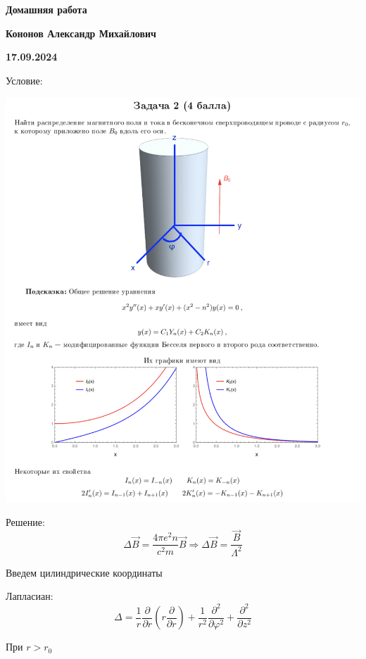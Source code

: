 \documentclass[12pt]{article}
\begin{document}
\begin{large}
\begin{center}
\LARGE \textbf{Домашняя работа}
\par
\LARGE \textbf{Кононов Александр Михайлович}
\par
    \textbf{17.09.2024}
\end{center}
\par Условие:
\par
\includegraphics[width=\textwidth]{photo.png}
\par Решение:
\[
    \Delta \overrightarrow{B} = \frac{4\pi e^2 n}{c^2 m} \overrightarrow{B} \Rightarrow \Delta \overrightarrow{B} = \frac{\overrightarrow{B}}{\Lambda^2}
\]
\par Введем цилиндрические координаты
\par Лапласиан:
\[
    \Delta = \frac{1}{r} \frac{\partial}{\partial r} \left( r \frac{\partial}{\partial r} \right) + \frac{1}{r^2} \frac{\partial^2}{\partial \varphi^2} + \frac{\partial^2}{\partial z^2}
\]
\par При $r > r_0$

\end{large}
\end{document}
